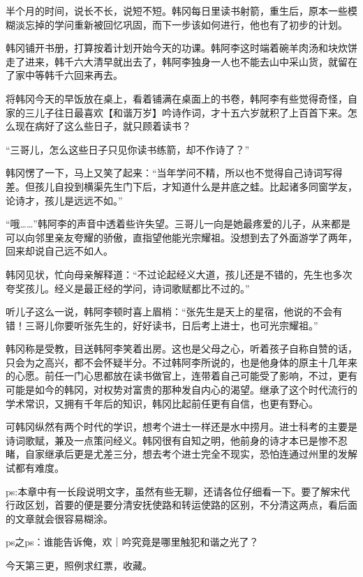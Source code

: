 半个月的时间，说长不长，说短不短。韩冈每日里读书射箭，重生后，原本一些模糊淡忘掉的学问重新被回忆巩固，而下一步该如何进行，他也有了初步的计划。

韩冈铺开书册，打算按着计划开始今天的功课。韩阿李这时端着碗羊肉汤和块炊饼走了进来，韩千六大清早就出去了，韩阿李独身一人也不能去山中采山货，就留在了家中等韩千六回来再去。

将韩冈今天的早饭放在桌上，看着铺满在桌面上的书卷，韩阿李有些觉得奇怪，自家的三儿子往日最喜欢【和谐万岁】吟诗作词，才十五六岁就积了上百首下来。怎么现在病好了这么些日子，就只顾着读书？

“三哥儿，怎么这些日子只见你读书练箭，却不作诗了？”

韩冈愣了一下，马上又笑了起来：“当年学问不精，所以也不觉得自己诗词写得差。但孩儿自投到横渠先生门下后，才知道什么是井底之蛙。比起诸多同窗学友，论诗才，孩儿是远远不如。”

“哦……”韩阿李的声音中透着些许失望。三哥儿一向是她最疼爱的儿子，从来都是可以向邻里亲友夸耀的骄傲，直指望他能光宗耀祖。没想到去了外面游学了两年，回来却说自己远不如人。

韩冈见状，忙向母亲解释道：“不过论起经义大道，孩儿还是不错的，先生也多次夸奖孩儿。经义是最正经的学问，诗词歌赋都比不过的。”

听儿子这么一说，韩阿李顿时喜上眉梢：“张先生是天上的星宿，他说的不会有错！三哥儿你要听张先生的，好好读书，日后考上进士，也可光宗耀祖。”

韩冈称是受教，目送韩阿李笑着出房。这也是父母之心，听着孩子自称自赞的话，只会为之高兴，都不会怀疑半分。不过韩阿李所说的，也是他身体的原主十几年来的心愿。前任一门心思都放在读书做官上，连带着自己可能受了影响，不过，更有可能是如今的韩冈，对权势对富贵的那种发自内心的渴望。继承了这个时代流行的学术常识，又拥有千年后的知识，韩冈比起前任更有自信，也更有野心。

可韩冈纵然有两个时代的学识，想考个进士一样还是水中捞月。进士科考的主要是诗词歌赋，兼及一点策问经义。韩冈很有自知之明，他前身的诗才本已是惨不忍睹，自家继承后更是尤差三分，想去考个进士完全不现实，恐怕连通过州里的发解试都有难度。

ps:本章中有一长段说明文字，虽然有些无聊，还请各位仔细看一下。要了解宋代行政区划，首要的便是要分清安抚使路和转运使路的区别，不分清这两点，看后面的文章就会很容易糊涂。

ps之ps：谁能告诉俺，欢｜吟究竟是哪里触犯和谐之光了？

今天第三更，照例求红票，收藏。

